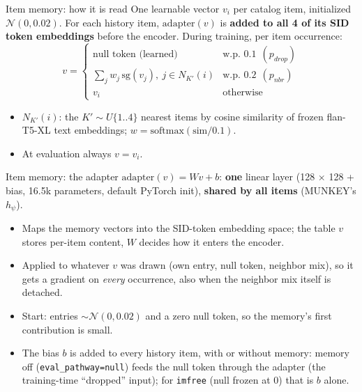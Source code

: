 \documentclass{beamer}
\begin{document}
\begin{frame}{Item memory: how it is read}
One learnable vector $v_i$ per catalog item, initialized $\mathcal{N}(0, 0.02)$.
For each history item, $\text{adapter}(v)$ is \textbf{added to all 4 of its SID
token embeddings} before the encoder. During training, per item occurrence:
\[
v = \begin{cases}
  \text{null token (learned)} & \text{w.p. } 0.1 \ \ (p_{drop}) \\
  \sum_j w_j\, \mathrm{sg}(v_j),\ j \in N_{K'}(i) & \text{w.p. } 0.2 \ \ (p_{nbr}) \\
  v_i & \text{otherwise}
\end{cases}
\]
\begin{itemize}
  \item $N_{K'}(i)$: the $K' \sim U\{1..4\}$ nearest items by cosine similarity
        of frozen flan-T5-XL text embeddings; $w = \mathrm{softmax}(\mathrm{sim}/0.1)$.
  \item At evaluation always $v = v_i$.
\end{itemize}
\end{frame}

\begin{frame}{Item memory: the adapter}
$\text{adapter}(v) = W v + b$: \textbf{one} linear layer (128 $\times$ 128 + bias,
16.5k parameters, default PyTorch init), \textbf{shared by all items} (MUNKEY's
$h_\psi$).
\begin{itemize}
  \item Maps the memory vectors into the SID-token embedding space; the table
        $v$ stores per-item content, $W$ decides how it enters the encoder.
  \item Applied to whatever $v$ was drawn (own entry, null token, neighbor mix),
        so it gets a gradient on \emph{every} occurrence, also when the
        neighbor mix itself is detached.
  \item Start: entries $\sim \mathcal{N}(0, 0.02)$ and a zero null token, so
        the memory's first contribution is small.
  \item The bias $b$ is added to every history item, with or without memory:
        memory off (\texttt{eval\_pathway=null}) feeds the null token through
        the adapter (the training-time ``dropped'' input); for \texttt{imfree}
        (null frozen at 0) that is $b$ alone.
\end{itemize}
\end{frame}
\end{document}
